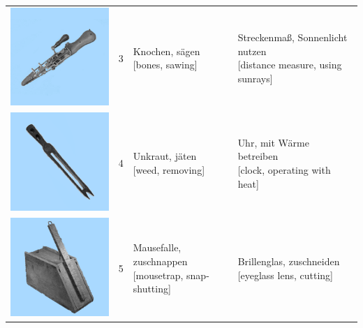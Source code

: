 \documentclass[
  english,
  doc,12pt,twoside,floatsintext]{apa7}
\begin{document}
\begin{center}
\begin{ThreePartTable}
{\begin{longtable}{llll}
\includegraphics[valign=c, scale=0.23]{../materials/unfamiliar/3.png} & 3 & \makecell[l]{Knochen, sägen\\{[bones, sawing]}} & \makecell[l]{Streckenmaß, Sonnenlicht nutzen\\{[distance measure, using sunrays]}}\\
\includegraphics[valign=c, scale=0.23]{../materials/unfamiliar/4.png} & 4 & \makecell[l]{Unkraut, jäten\\{[weed, removing]}} & \makecell[l]{Uhr, mit Wärme betreiben\\{[clock, operating with heat]}}\\
\includegraphics[valign=c, scale=0.23]{../materials/unfamiliar/5.png} & 5 & \makecell[l]{Mausefalle, zuschnappen\\{[mousetrap, snap-shutting]}} & \makecell[l]{Brillenglas, zuschneiden\\{[eyeglass lens, cutting]}}\\

\end{longtable}}
\end{ThreePartTable}
\end{center}
\end{document}
